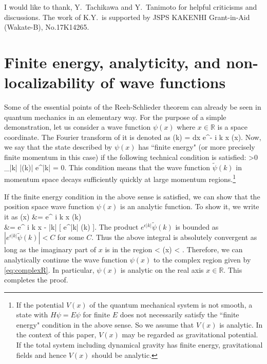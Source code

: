 \documentclass[a4paper,11pt]{article}
\theoremstyle{plain}
\theoremstyle{definition}
\numberwithin{thm}{section}
\def\Im{\mathop{\mathrm{Im}}}
\def\BR{{\mathbb R}}
\def\beq#1\eeq{\begin{align}#1\end{align}}
\begin{document}
\acknowledgments
I would like to thank, Y.~Tachikawa and Y.~Tanimoto for helpful criticisms and discussions.
The work of K.Y.~is supported by JSPS KAKENHI Grant-in-Aid (Wakate-B), No.17K14265.


\appendix

\section{Finite energy, analyticity, and non-localizability of wave functions}\label{app:wave}
Some of the essential points of the Reeh-Schlieder theorem can already be seen in quantum mechanics in an elementary way.
For the purpose of a simple demonstration, let us consider a wave function $\psi(x)$ where $x \in \BR$ is a space coordinate.
The Fourier transform of it is denoted as
\beq
\widetilde{\psi}(k) = \int dx e^{- i k x} \psi(x).
\eeq
Now, we say that the state described by $\psi(x)$ has ``finite energy" (or more precisely finite momentum in this case) 
if the following technical condition is satisfied:
\beq
\exists \epsilon >0  \lim_{|k| \to \infty} |\widetilde{\psi}(k)| e^{\epsilon |k|} = 0.
\eeq
This condition means that the wave function $\widetilde{\psi}(k)$ in momentum space decays sufficiently quickly at large momentum regions.\footnote{
If the potential $V(x)$ of the quantum mechanical system is not smooth, a state with $H \psi = E \psi$ for finite $E$ does not necessarily satisfy
the ``finite energy" condition in the above sense. So we assume that $V(x)$ is analytic.
In the context of this paper, $V(x)$ may be regarded as gravitational potential. If the total system including dynamical gravity has finite energy,
gravitational fields and hence $V(x)$ should be analytic.
}


If the finite energy condition in the above sense is satisfied, we can show that the position space wave function $\psi(x)$ is an analytic function.
To show it, we write it as
\beq
\psi(x) &= \int {} e^{ i k x} \widetilde{\psi}(k) \nonumber \\
&= \int {} e^{ i k x - \epsilon |k|} [ e^{\epsilon |k|} \widetilde{\psi}(k) ].
\eeq
The product $e^{\epsilon |k|} \widetilde{\psi}(k)$ is bounded as $|e^{\epsilon |k|} \widetilde{\psi}(k) | <C$ for some $C$.
Thus the above integral is absolutely convergent as long as the imaginary part of $x$ is in the region
\beq
 - \epsilon < \Im (x) < \epsilon. \label{eq:complexR}
\eeq
Therefore, we can analytically continue the wave function $\psi(x)$ to the complex region given by \eqref{eq:complexR}.
In particular, $\psi(x)$ is analytic on the real axis $x \in \BR$. This completes the proof.
\end{document}
